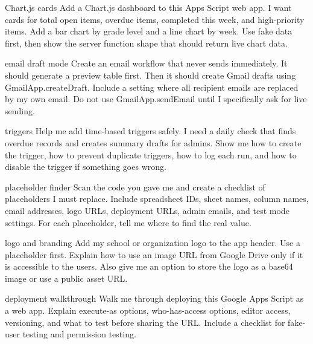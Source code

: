 \documentclass[10pt]{article}
\newcommand{\code}[1]{\texttt{\detokenize{#1}}}
\begin{document}
\begin{promptbox}{Chart.js cards}
Add a Chart.js dashboard to this Apps Script web app. I want cards for total open items, overdue items, completed this week, and high-priority items. Add a bar chart by grade level and a line chart by week. Use fake data first, then show the server function shape that should return live chart data.
\end{promptbox}

\begin{promptbox}{email draft mode}
Create an email workflow that never sends immediately. It should generate a preview table first. Then it should create Gmail drafts using GmailApp.createDraft. Include a \code{TEST_MODE} setting where all recipient emails are replaced by my own email. Do not use GmailApp.sendEmail until I specifically ask for live sending.
\end{promptbox}

\begin{promptbox}{triggers}
Help me add time-based triggers safely. I need a daily check that finds overdue records and creates summary drafts for admins. Show me how to create the trigger, how to prevent duplicate triggers, how to log each run, and how to disable the trigger if something goes wrong.
\end{promptbox}

\begin{promptbox}{placeholder finder}
Scan the code you gave me and create a checklist of placeholders I must replace. Include spreadsheet IDs, sheet names, column names, email addresses, logo URLs, deployment URLs, admin emails, and test mode settings. For each placeholder, tell me where to find the real value.
\end{promptbox}

\begin{promptbox}{logo and branding}
Add my school or organization logo to the app header. Use a \code{LOGO_URL} placeholder first. Explain how to use an image URL from Google Drive only if it is accessible to the users. Also give me an option to store the logo as a base64 image or use a public asset URL.
\end{promptbox}

\begin{promptbox}{deployment walkthrough}
Walk me through deploying this Google Apps Script as a web app. Explain execute-as options, who-has-access options, editor access, versioning, and what to test before sharing the URL. Include a checklist for fake-user testing and permission testing.
\end{promptbox}
\end{document}
